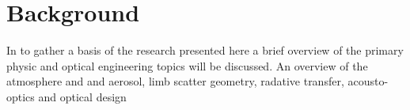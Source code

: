 \chapter{Background}
In to gather a basis of the research presented here a brief overview of the primary physic and optical engineering topics will be discussed. An overview of the atmosphere and and aerosol, limb scatter geometry, radative transfer, acousto-optics and optical design

 

 
  